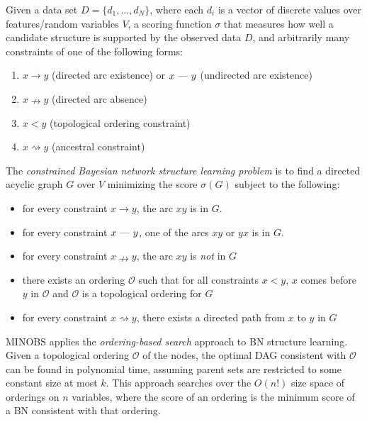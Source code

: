 \documentclass[twoside,11pt]{article}
\begin{document}
\begin{definition}

Given a data set $D = \{d_1, \ldots, d_N\}$, where each $d_i$
is a vector of discrete values over features/random variables
$\mathit{V}$, a scoring function $\sigma$ that measures how
well a candidate structure is supported by the observed data $D$,
and arbitrarily many constraints of one of the following forms:
\begin{enumerate}
\itemsep0em
\item $x \rightarrow y$ (directed arc existence) or  $x \text{ \textemdash \  } y$ (undirected arc existence)
\item $x \nrightarrow y$ (directed arc absence)
\item $x < y$ (topological ordering constraint)
\item $x \rightsquigarrow y$ (ancestral constraint)
\end{enumerate}
The \emph{constrained Bayesian network structure learning problem} is to
find a directed acyclic graph $\mathit{G}$ over $\mathit{V}$ minimizing the score $\sigma( \mathit{G} )$ subject to
the following:

\begin{itemize}
\itemsep0em
\item for every constraint $x \rightarrow y$, the arc $xy$ is in $G$.
\item for every constraint $x \text{ \textemdash \  } y$, one of the arcs $xy$ or $yx$ is in $G$.
\item for every constraint $x \nrightarrow y$, the arc $xy$ is \emph{not} in $G$
\item there exists an ordering $\mathcal{O}$ such that for all constraints $x < y$, $x$ comes before $y$ in $\mathcal{O}$ and $\mathcal{O}$ is a
	topological ordering for $G$
\item for every constraint $x \rightsquigarrow y$, there exists a directed path from $x$ to $y$ in $G$

\end{itemize}
\end{definition}

\smallskip

MINOBS applies the \emph{ordering-based search} \citep{TeyssierK05} approach to BN structure learning. Given a topological ordering $\mathcal{O}$ of the nodes, the optimal DAG consistent with $\mathcal{O}$ can be found in polynomial time, assuming parent sets are restricted to some constant size at most $k$. This approach searches over the $O(n!)$ size space of orderings on $n$ variables, where the score of an ordering is the minimum score of a BN consistent with that ordering. 
\end{document}
